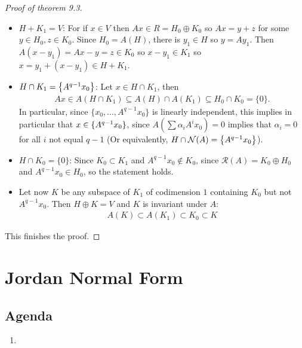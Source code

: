 \documentclass[10pt,twoside,openany,final]{memoir}
\theoremstyle{break}
\theoremstyle{Break}
\newcommand{\Rg}{\mathcal{R}}
\newcommand{\Nl}{\mathcal{N}}
\let\Span\relax
\DeclareMathOperator{\Span}{Span}
\begin{document}
\begin{proof}[Proof of theorem 9.3]
	\begin{itemize}
		\item $H+K_1=V$: For if $x \in V$ then $Ax \in R=H_0 \oplus K_0$ so $Ax=y+z$ for some $y \in H_0, z \in K_0$. Since $H_0 = A(H)$, there is $y_1 \in H$ so $y= Ay_1$. Then $A(x-y_1)=Ax-y=z \in K_0$ so $x-y_1 \in K_1$ so $x = y_1+(x-y_1) \in H+K_1$.
		\item $H \cap K_1 = \Span\left\{ A^{q-1}x_0 \right\}$: Let $x \in H \cap K_1$, then 
			\begin{align*}
				Ax \in A(H \cap K_1) \subseteq A(H) \cap A(K_1) \subseteq H_0 \cap K_0=\{0\}.
			\end{align*}
			In particular, since $\{x_0,\dots,A^{q-1}x_0\}$ is linearly independent, this implies in particular that $x \in \Span\{A^{q-1}x_0\}$, since $A\left( \sum \alpha_i A^ix_0 \right)=0$ implies that $\alpha_i=0$ for all $i$ not equal $q-1$ (Or equivalently, $H \cap \Nl(A)=\Span\left\{ A^{q-1}x_0 \right\}$).
		\item $H \cap K_0= \{0\}$: Since $K_0 \subset K_1$ and $A^{q-1}x_0 \not\in K_0$, since $\Rg(A)=K_0 \oplus H_0$ and $A^{q-1}x_0 \in H_0$, so the statement holds.
		\item Let now $K$ be any subspace of $K_1$ of codimension $1$ containing $K_0$ but not $A^{q-1}x_0$. Then $H \oplus K=V$ and $K$ is invariant under $A$:
			\begin{align*}
				A(K) \subset A(K_1) \subset K_0 \subset K
			\end{align*}
	\end{itemize}
This finishes the proof.
\end{proof}

\chapter{Jordan Normal Form}
\section*{Agenda}
\begin{enumerate}
	\item 
\end{enumerate}
\end{document}
